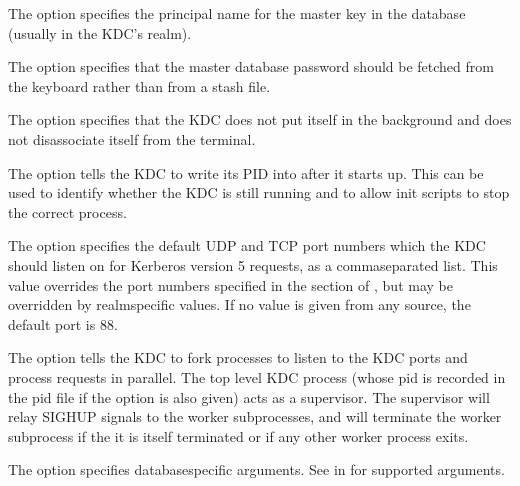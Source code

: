 \documentclass[letterpaper,10pt,english]{sphinxmanual}
\begin{document}
\sphinxAtStartPar
The   option specifies the principal name for the
master key in the database (usually  in the KDC’s realm).

\sphinxAtStartPar
The  option specifies that the master database password should
be fetched from the keyboard rather than from a stash file.

\sphinxAtStartPar
The  option specifies that the KDC does not put itself in the
background and does not disassociate itself from the terminal.

\sphinxAtStartPar
The   option tells the KDC to write its PID into
 after it starts up.  This can be used to identify whether
the KDC is still running and to allow init scripts to stop the correct
process.

\sphinxAtStartPar
The   option specifies the default UDP and TCP port
numbers which the KDC should listen on for Kerberos version 5
requests, as a comma\sphinxhyphen{}separated list.  This value overrides the port
numbers specified in the {\hyperref[\detokenize{admin/conf_files/kdc_conf:kdcdefaults}]{}} section of
{\hyperref[\detokenize{admin/conf_files/kdc_conf:kdc-conf-5}]{}}, but may be overridden by realm\sphinxhyphen{}specific values.
If no value is given from any source, the default port is 88.

\sphinxAtStartPar
The   option tells the KDC to fork 
processes to listen to the KDC ports and process requests in parallel.
The top level KDC process (whose pid is recorded in the pid file if
the  option is also given) acts as a supervisor.  The supervisor
will relay SIGHUP signals to the worker subprocesses, and will
terminate the worker subprocess if the it is itself terminated or if
any other worker process exits.

\sphinxAtStartPar
The   option specifies database\sphinxhyphen{}specific arguments.
See {\hyperref[\detokenize{admin/admin_commands/kadmin_local:dboptions}]{}} in {\hyperref[\detokenize{admin/admin_commands/kadmin_local:kadmin-1}]{}} for
supported arguments.
\end{document}
